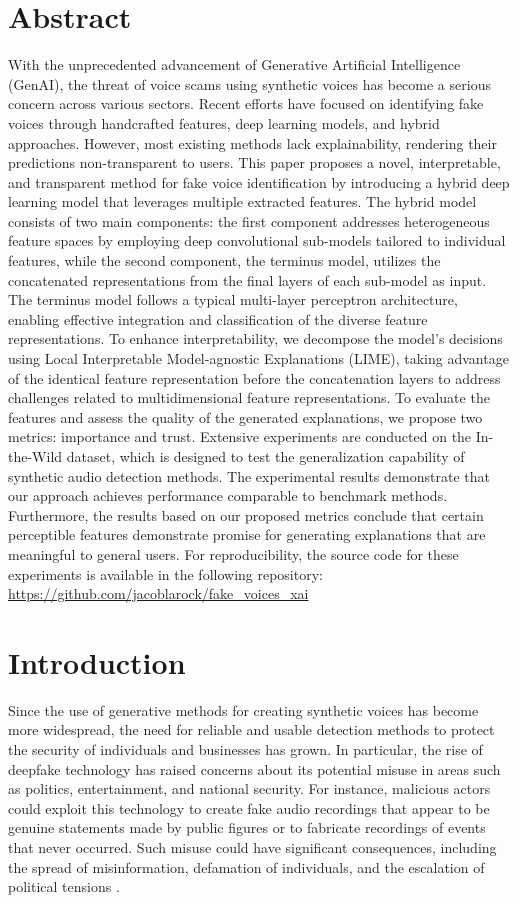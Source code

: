 \documentclass{article}
\begin{document}
\section{Abstract}
\sloppy
With the unprecedented advancement of Generative Artificial Intelligence (GenAI), the threat of voice scams using synthetic voices has become a serious concern across various sectors. Recent efforts have focused on identifying fake voices through handcrafted features, deep learning models, and hybrid approaches. However, most existing methods lack explainability, rendering their predictions non-transparent to users. This paper proposes a novel, interpretable, and transparent method for fake voice identification by introducing a hybrid deep learning model that leverages multiple extracted features. The hybrid model consists of two main components: the first component addresses heterogeneous feature spaces by employing deep convolutional sub-models tailored to individual features, while the second component, the terminus model, utilizes the concatenated representations from the final layers of each sub-model as input. The terminus model follows a typical multi-layer perceptron architecture, enabling effective integration and classification of the diverse feature representations. To enhance interpretability, we decompose the model’s decisions using Local Interpretable Model-agnostic Explanations (LIME), taking advantage of the identical feature representation before the concatenation layers to address challenges related to multidimensional feature representations. To evaluate the features and assess the quality of the generated explanations, we propose two metrics: importance and trust. Extensive experiments are conducted on the In-the-Wild dataset, which is designed to test the generalization capability of synthetic audio detection methods. The experimental results demonstrate that our approach achieves performance comparable to benchmark methods. Furthermore, the results based on our proposed metrics conclude that certain perceptible features demonstrate promise for generating explanations that are meaningful to general users. For reproducibility, the source code for these experiments is available in the following repository: \url{https://github.com/jacoblarock/fake_voices_xai}

\section{Introduction}
Since the use of generative methods for creating synthetic voices has become more widespread, the need for reliable and usable detection methods to protect the security of individuals and businesses has grown. In particular, the rise of deepfake technology has raised concerns about its potential misuse in areas such as politics, entertainment, and national security. For instance, malicious actors could exploit this technology to create fake audio recordings that appear to be genuine statements made by public figures or to fabricate recordings of events that never occurred. Such misuse could have significant consequences, including the spread of misinformation, defamation of individuals, and the escalation of political tensions \cite{veerasamy_rising_2022,albahar_deepfakes_2005}.
\end{document}
